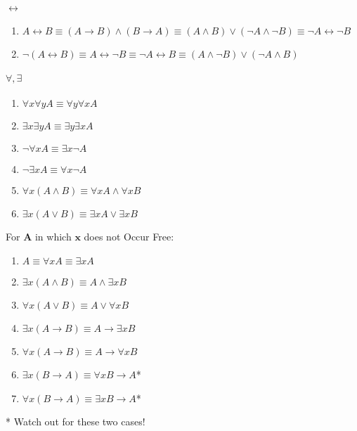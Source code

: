 \documentclass[10pt,twoside,twocolumn]{article}
\begin{document}
\paragraph{$\boldsymbol{\leftrightarrow}$}
\begin{enumerate}
\item $A\leftrightarrow B\equiv\left(A\rightarrow B\right)\land\left(B\rightarrow A\right)\equiv\left(A\land B\right)\lor\left(\lnot A\land\lnot B\right)\equiv\lnot A\leftrightarrow\lnot B$
\item $\lnot\left(A\leftrightarrow B\right)\equiv A\leftrightarrow\lnot B\equiv\lnot A\leftrightarrow B\equiv\left(A\land\lnot B\right)\lor\left(\lnot A\land B\right)$
\end{enumerate}

\paragraph{$\boldsymbol{\forall,\exists}$}
\begin{enumerate}
\item $\forall x\forall yA\equiv\forall y\forall xA$
\item $\exists x\exists yA\equiv\exists y\exists xA$
\item $\lnot\forall xA\equiv\exists x\lnot A$
\item $\lnot\exists xA\equiv\forall x\lnot A$
\item $\forall x\left(A\land B\right)\equiv\forall xA\land\forall xB$
\item $\exists x\left(A\lor B\right)\equiv\exists xA\lor\exists xB$
\end{enumerate}
For $\boldsymbol{A}$ in which $\boldsymbol{x}$ does not Occur Free:
\begin{enumerate}
\item $A\equiv\forall xA\equiv\exists xA$
\item $\exists x\left(A\land B\right)\equiv A\land\exists xB$
\item $\forall x\left(A\lor B\right)\equiv A\lor\forall xB$
\item $\exists x\left(A\rightarrow B\right)\equiv A\rightarrow\exists xB$
\item $\forall x\left(A\rightarrow B\right)\equiv A\rightarrow\forall xB$
\item $\exists x\left(B\rightarrow A\right)\equiv\forall xB\rightarrow A${*}
\item $\forall x\left(B\rightarrow A\right)\equiv\exists xB\rightarrow A${*}
\end{enumerate}
{*} Watch out for these two cases!
\end{document}
